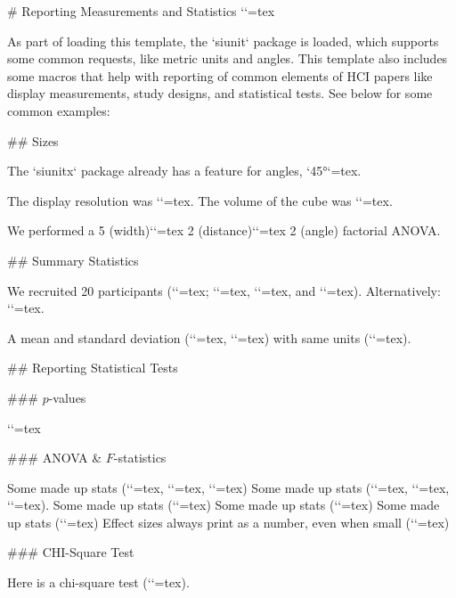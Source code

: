 \begin{markdown}


# Reporting Measurements and Statistics
`\label{sec:statistics}`{=tex}

As part of loading this template, the `siunit` package is loaded, which supports some common requests, like metric units and angles. This template also includes some macros that help with reporting of common elements of HCI papers like display measurements, study designs, and statistical tests. See below for some common examples: 

## Sizes

The `siunitx` package already has a feature for angles, `\ang{45}`{=tex}.

The display resolution was ``{=tex}.
The volume of the cube was ``{=tex}.

We performed a 5 (width)`\by`{=tex} 2 (distance)`\by`{=tex} 2 (angle) factorial ANOVA.


## Summary Statistics

We recruited 20 participants (``{=tex}; ``{=tex}, ``{=tex}, and ``{=tex}).
Alternatively: ``{=tex}.

A mean and standard deviation (``{=tex}, ``{=tex}) with same units (``{=tex}).



## Reporting Statistical Tests

### $p$-values

``{=tex}

### ANOVA & $F$-statistics

Some made up stats (``{=tex}, ``{=tex}, ``{=tex})
Some made up stats (``{=tex}, ``{=tex}, ``{=tex}).
Some made up stats (``{=tex})
Some made up stats (``{=tex})
Some made up stats (``{=tex})
Effect sizes always print as a number, even when small (``{=tex})

### CHI-Square Test

Here is a chi-square test (``{=tex}).


\end{markdown}